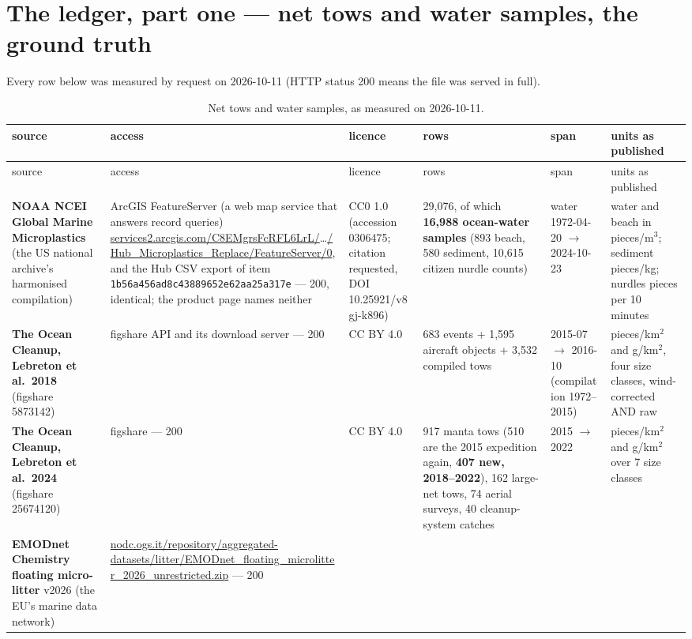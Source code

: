 \documentclass[10pt]{article}
\newcommand{\code}[1]{\texttt{#1}}
\begin{document}
\section{The ledger, part one --- net tows and water samples, the ground truth}

Every row below was measured by request on 2026-10-11 (HTTP status 200 means the file was served in full).

{\setlength{\tabcolsep}{2pt}\scriptsize
\begin{longtable}{@{}L{3.0cm}L{3.4cm}L{2.1cm}L{2.6cm}L{1.8cm}L{2.5cm}@{}}
\caption{Net tows and water samples, as measured on 2026-10-11.} \label{tab:nets}\\
\toprule
source & access & licence & rows & span & units as published \\
\midrule
\endfirsthead
\toprule
source & access & licence & rows & span & units as published \\
\midrule
\endhead
\textbf{NOAA NCEI Global Marine Microplastics} (the US national archive's harmonised compilation) & ArcGIS
FeatureServer (a web map service that answers record queries)
\url{services2.arcgis.com/C8EMgrsFcRFL6LrL/}\dots\url{/Hub_Microplastics_Replace/FeatureServer/0}, and the Hub CSV
export of item \code{1b56a456ad8c4388\allowbreak 9652e62aa25a317e} --- 200, identical; the product page names neither & CC0 1.0
(accession 0306475; citation requested, DOI 10.25921/v8gj-k896) & 29,076, of which \textbf{16,988 ocean-water
samples} (893 beach, 580 sediment, 10,615 citizen nurdle counts) & water 1972-04-20 $\to$ 2024-10-23 & water and
beach in pieces/m$^3$; sediment pieces/kg; nurdles pieces per 10 minutes \\
\addlinespace
\textbf{The Ocean Cleanup, Lebreton et al.\ 2018} (figshare 5873142) & figshare API and its download server --- 200
& CC BY 4.0 & 683 events + 1,595 aircraft objects + 3,532 compiled tows & 2015-07 $\to$ 2016-10 (compilation
1972--2015) & pieces/km$^2$ and g/km$^2$, four size classes, wind-corrected AND raw \\
\addlinespace
\textbf{The Ocean Cleanup, Lebreton et al.\ 2024} (figshare 25674120) & figshare --- 200 & CC BY 4.0 & 917 manta
tows (510 are the 2015 expedition again, \textbf{407 new, 2018--2022}), 162 large-net tows, 74 aerial surveys, 40
cleanup-system catches & 2015 $\to$ 2022 & pieces/km$^2$ and g/km$^2$ over 7 size classes \\
\addlinespace
\textbf{EMODnet Chemistry floating micro-litter} v2026 (the EU's marine data network) &
\url{nodc.ogs.it/repository/aggregated-datasets/litter/EMODnet_floating_microlitter_2026_unrestricted.zip} --- 200

\end{longtable}}
\end{document}
